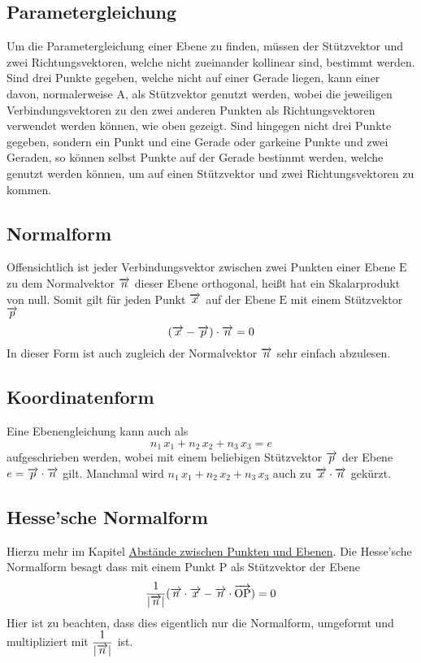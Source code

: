 \documentclass{article}
\begin{document}
\subsection{Parametergleichung}
Um die Parametergleichung einer Ebene zu finden, müssen der Stützvektor und zwei Richtungsvektoren, welche nicht zueinander kollinear sind, bestimmt werden. Sind drei Punkte gegeben, welche nicht auf einer Gerade liegen, kann einer davon, normalerweise $\mathrm{A}$, als Stützvektor genutzt werden, wobei die jeweiligen Verbindungsvektoren zu den zwei anderen Punkten als Richtungsvektoren verwendet werden können, wie oben gezeigt. \newline
Sind hingegen nicht drei Punkte gegeben, sondern ein Punkt und eine Gerade oder garkeine Punkte und zwei Geraden, so können selbst Punkte auf der Gerade bestimmt werden, welche genutzt werden können, um auf einen Stützvektor und zwei Richtungsvektoren zu kommen.
 
\subsection{Normalform}
Offensichtlich ist jeder Verbindungsvektor zwischen zwei Punkten einer Ebene $\mathrm{E}$ zu dem Normalvektor $\overrightarrow{n}$ dieser Ebene orthogonal, heißt hat ein Skalarprodukt von null. Somit gilt für jeden Punkt $\overrightarrow{x}$ auf der Ebene $\mathrm{E}$ mit einem Stützvektor $\overrightarrow{p}$
\[
 (\overrightarrow{x} - \overrightarrow{p}) \cdot \overrightarrow{n} = 0 
\]
In dieser Form ist auch zugleich der Normalvektor $\overrightarrow{n}$ sehr einfach abzulesen. 
 
\subsection{Koordinatenform}
Eine Ebenengleichung kann auch als
\[
 n_1 \, x_1 + n_2 \, x_2 + n_3 \, x_3 = e 
\]
aufgeschrieben werden, wobei mit einem beliebigen Stützvektor $\overrightarrow{p}$ der Ebene $e = \overrightarrow{p} \cdot \overrightarrow{n}$ gilt. Manchmal wird $n_1 \, x_1 + n_2 \, x_2 + n_3 \, x_3$ auch zu $\overrightarrow{x} \cdot \overrightarrow{n}$ gekürzt.
 
\subsection{Hesse'sche Normalform}
Hierzu mehr im Kapitel \hyperref[Abstände zwischen Punkten und Ebenen]{Abstände zwischen Punkten und Ebenen}. Die Hesse'sche Normalform besagt dass mit einem Punkt $\mathrm{P}$ als Stützvektor der Ebene
\[
 \frac{1}{|\overrightarrow{n}|} (\overrightarrow{n} \cdot \overrightarrow{x} - \overrightarrow{n} \cdot \overrightarrow{\mathrm{OP}}) = 0 
\]
Hier ist zu beachten, dass dies eigentlich nur die Normalform, umgeformt und multipliziert mit $\dfrac{1}{|\overrightarrow{n}|}$ ist.
 
\end{document}

